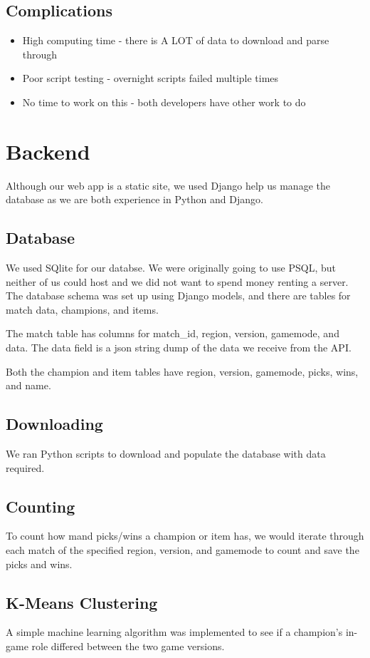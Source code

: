 \documentclass{article}
\begin{document}
\subsection{Complications}
\begin{itemize}
    \item High computing time - there is A LOT of data to download and parse through
    \item Poor script testing - overnight scripts failed multiple times
    \item No time to work on this - both developers have other work to do
\end{itemize}


\section{Backend}
Although our web app is a static site, we used Django help us manage the database as we are both experience in Python and Django.

\subsection{Database}
We used SQlite for our databse. We were originally going to use PSQL, but neither of us could host and we did not want to spend money renting a server. The database schema was set up using Django models, and there are tables for match data, champions, and items.

The match table has columns for match\_id, region, version, gamemode, and data. The data field is a json string dump of the data we receive from the API.

Both the champion and item tables have region, version, gamemode, picks, wins, and name.

\subsection{Downloading}
We ran Python scripts to download and populate the database with data required.

\subsection{Counting}
To count how mand picks/wins a champion or item has, we would iterate through each match of the specified region, version, and gamemode to count and save the picks and wins.

\subsection{K-Means Clustering}
A simple machine learning algorithm was implemented to see if a champion's in-game role differed between the two game versions. 
\end{document}
